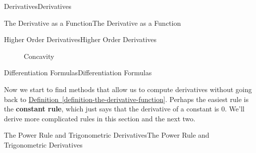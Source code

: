 \documentclass[10pt,]{book}
\newcommand{\terminology}[1]{\textbf{#1}}
\numberwithin{equation}{section}
\begin{document}
\begin{chapterptx}{Derivatives}{}{Derivatives}{}{}
\begin{sectionptx}{The Derivative as a Function}{}{The Derivative as a Function}{}{}
\begin{subsectionptx}{Higher Order Derivatives}{}{Higher Order Derivatives}{}{}
\begin{figure}
\begin{sidebyside}{2}{0}{0}{0}
\begin{sbspanel}{0.5}
{{
}
}
\end{sbspanel}%
\begin{sbscaption}{0.5}%
\end{sbscaption}%
\begin{sbscaption}{0.5}%
\end{sbscaption}%
\end{sidebyside}%
\caption{Concavity\label{figure-concavity-graphs}}
\end{figure}
\end{subsectionptx}
\end{sectionptx}
%
%
\typeout{************************************************}
\typeout{************************************************}
%
\begin{sectionptx}{Differentiation Formulas}{}{Differentiation Formulas}{}{}\label{section-differentiation-formulas}
\begin{introduction}{}%
\hypertarget{p-123}{}%
Now we start to find methods that allow us to compute derivatives without going back to \hyperref[definition-the-derivative-function]{Definition~\ref{definition-the-derivative-function}}. Perhaps the easiest rule is the \terminology{constant rule}, which just says that the derivative of a constant is \(0\). We'll derive more complicated rules in this section and the next two.%
\end{introduction}%
%
%
\typeout{************************************************}
\typeout{************************************************}
%
\begin{subsectionptx}{The Power Rule and Trigonometric Derivatives}{}{The Power Rule and Trigonometric Derivatives}{}{}\label{subsection-the-power-rule-and-trigonometric-derivatives}
\hypertarget{p-124}{}%

\end{subsectionptx}
\end{sectionptx}
\end{chapterptx}
\end{document}
